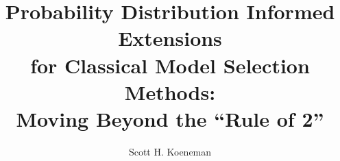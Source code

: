 

\titlepgtrue
\copyrighttrue %
\acktrue %
\dedicationtrue
\tablecontentstrue
\tablespagetrue
\figurespagetrue

\title{Probability Distribution Informed Extensions \\
for Classical Model Selection Methods:\\
Moving Beyond the ``Rule of 2''}
\author{Scott H. Koeneman}

